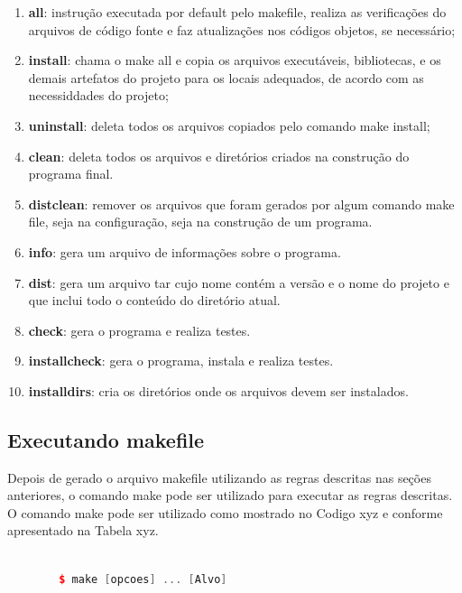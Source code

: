 \begin{enumerate}
    \item \textbf{all}: instrução executada por default pelo makefile, 
realiza as verificações do arquivos de código fonte e faz atualizações
 nos códigos objetos, se necessário;
    \item \textbf{install}: chama o make all e copia os arquivos 
executáveis, bibliotecas, e os demais artefatos do projeto para os 
locais adequados, de acordo com as necessiddades do projeto;
    \item \textbf{uninstall}: deleta todos os arquivos copiados 
pelo comando make install;
    \item \textbf{clean}: deleta todos os arquivos e diretórios 
criados na construção do programa final.
    \item \textbf{distclean}: remover os arquivos que foram gerados
 por algum comando make file, seja na configuração, seja na
 construção de um programa.
    \item \textbf{info}: gera um arquivo de informações sobre o programa.
    \item \textbf{dist}: gera um arquivo tar cujo nome contém a versão e
o nome do projeto e  que inclui  todo o conteúdo do diretório atual.
    \item \textbf{check}: gera o programa  e realiza testes. 
    \item \textbf{installcheck}: gera o programa, instala e realiza testes.
    \item \textbf{installdirs}: cria  os diretórios onde os arquivos devem ser instalados.
\end{enumerate}


\subsection{Executando makefile}

Depois de gerado o arquivo makefile utilizando as regras descritas nas seções anteriores,
 o comando make pode ser utilizado para executar as regras descritas.
O comando make pode ser utilizado como mostrado no Codigo xyz e conforme apresentado na Tabela xyz.


    \begin{lstlisting}[language=C++,frame=single,title={Código 23: 
                              Definição de variavel e utilização},
                                                    label=codigo_23]
    
        $ make [opcoes] ... [Alvo]

    \end{lstlisting}


